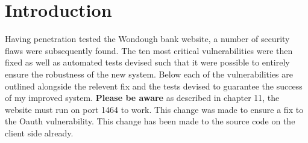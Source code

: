 \tableofcontents
\section{Introduction}

Having penetration tested the Wondough bank website, a number of security flaws were subsequently found. The ten most critical vulnerabilities were then fixed as
well as automated tests devised such that it were possible to entirely ensure the robustness of the new system. Below each of the vulnerabilities are outlined alongside
the relevent fix and the tests devised to guarantee the success of my improved system. \textbf{Please be aware} as described in chapter 11, the website must run on port 1464 to
work. This change was made to ensure a fix to the Oauth vulnerability. This change has been made to the source code on the client side already.